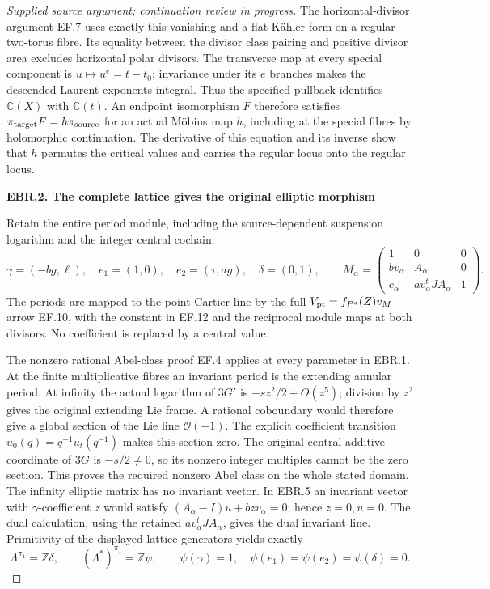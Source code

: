 \begin{proof}[Supplied source argument; continuation review in progress]
The horizontal-divisor argument EF.7 uses exactly this vanishing
and a flat Kähler form on a regular two-torus fibre. Its equality
between the divisor class pairing and positive divisor area excludes
horizontal polar divisors. The transverse map at every special
component is \(u\mapsto u^e=t-t_0\); invariance under its \(e\)
branches makes the descended Laurent exponents integral. Thus the
specified pullback identifies \(\mathbb C(X)\) with
\(\mathbb C(t)\). An endpoint isomorphism \(F\) therefore satisfies
\(\pi_{\rm target}F=h\pi_{\rm source}\) for an actual Möbius map
\(h\), including at the special fibres by holomorphic continuation.
The derivative of this equation and its inverse show that \(h\)
permutes the critical values and carries the regular locus onto
the regular locus.

\par

\medskip\noindent\textbf{EBR.2. The complete lattice gives the original elliptic morphism}

\par\nobreak

Retain the entire period module, including the source-dependent
suspension logarithm and the integer central cochain:
\[
 \gamma=(-bg,\ell),\quad e_1=(1,0),\quad
 e_2=(\tau,ag),\quad \delta=(0,1),\qquad
 M_\alpha=
 \begin{pmatrix}
 1&0&0\\ bv_\alpha&A_\alpha&0\\
 c_\alpha&a v_\alpha^tJA_\alpha&1
 \end{pmatrix}.
 \tag{EBR.5}
\]
The periods are mapped to the point-Cartier line by the full
\(V_{\rm pt}=f_{P^a}(Z)v_M\) arrow EF.10, with the constant
in EF.12 and the reciprocal module maps at both divisors.
No coefficient is replaced by a central value.

The nonzero rational Abel-class proof EF.4 applies at every
parameter in EBR.1. At the finite multiplicative fibres an invariant
period is the extending annular period. At infinity the actual
logarithm of \(3G'\) is \(-sz^2/2+O(z^5)\); division by \(z^2\)
gives the original extending Lie frame. A rational coboundary would
therefore give a global section of the Lie line \(\mathcal O(-1)\).
The explicit coefficient transition
\(u_0(q)=q^{-1}u_t(q^{-1})\) makes this section zero. The original
central additive coordinate of \(3G\) is \(-s/2\ne0\), so its
nonzero integer multiples cannot be the zero section. This proves
the required nonzero Abel class on the whole stated domain.
The infinity elliptic matrix has no invariant vector. In EBR.5 an
invariant vector with \(\gamma\)-coefficient \(z\) would satisfy
\((A_\alpha-I)u+bzv_\alpha=0\); hence \(z=0,u=0\).
The dual calculation, using the retained
\(a v_\alpha^tJA_\alpha\), gives the dual invariant line.
Primitivity of the displayed lattice generators yields exactly
\[
 \Lambda^{\pi_1}=\mathbb Z\delta,\qquad
 (\Lambda^*)^{\pi_1}=\mathbb Z\psi,\qquad
 \psi(\gamma)=1,\quad\psi(e_1)=\psi(e_2)=\psi(\delta)=0.
 \tag{EBR.6}
\]


\end{proof}
